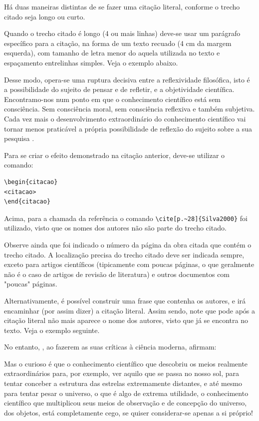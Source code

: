 \begin{apendicesenv}
Há duas maneiras distintas de se fazer uma citação literal, conforme o trecho citado seja longo ou curto.

Quando o trecho citado é longo (4 ou mais linhas) deve-se usar um parágrafo específico para a citação, na forma de um texto recuado (4 cm da margem esquerda), com tamanho de letra menor do aquela utilizada no texto e espaçamento entrelinhas simples. Veja o exemplo abaixo.

\begin{citacao}
    Desse modo, opera-se uma ruptura decisiva entre a reflexividade filosófica, isto é a possibilidade do sujeito de pensar e de refletir, e a objetividade científica.     Encontramo-nos num ponto em que o conhecimento científico está sem consciência. Sem consciência moral, sem consciência reflexiva e também subjetiva. Cada vez mais o desenvolvimento extraordinário do conhecimento científico vai tornar menos praticável a própria possibilidade de reflexão do sujeito sobre a sua pesquisa \cite[p.~28]{Silva2000}.
\end{citacao}

Para se criar o efeito demonstrado na citação anterior, deve-se utilizar o comando:

\begin{verbatim}
\begin{citacao}
<citacao>
\end{citacao}
\end{verbatim}

Acima, para a chamada da referência o comando \verb|\cite[p.~28]{Silva2000}| foi utilizado, visto que os nomes dos autores não são parte do trecho citado.

Observe ainda que foi indicado o número da página da obra citada que contém o trecho citado. A localização precisa do trecho citado deve ser indicada sempre, exceto para artigos científicos (tipicamente com poucas páginas, o que geralmente não é o caso de artigos de revisão de literatura) e outros documentos com "poucas"{} páginas.

Alternativamente, é possível construir uma frase que contenha os autores, e irá encaminhar (por assim dizer) a citação literal. Assim sendo, note que pode após a citação literal não mais aparece o nome dos autores, visto que já se encontra no texto. Veja o exemplo seguinte.

No entanto, , ao fazerem as suas críticas à ciência moderna, afirmam:

\begin{citacao}
    Mas o curioso é que o conhecimento científico que descobriu os meios realmente extraordinários para, por exemplo, ver aquilo que se passa no nosso sol, para tentar conceber a estrutura das estrelas extremamente distantes, e até mesmo para tentar pesar o universo, o que é algo de extrema utilidade, o conhecimento científico que multiplicou seus meios de observação e de concepção do universo, dos objetos, está completamente cego, se quiser considerar-se apenas a si próprio!
\end{citacao}



\end{apendicesenv}
